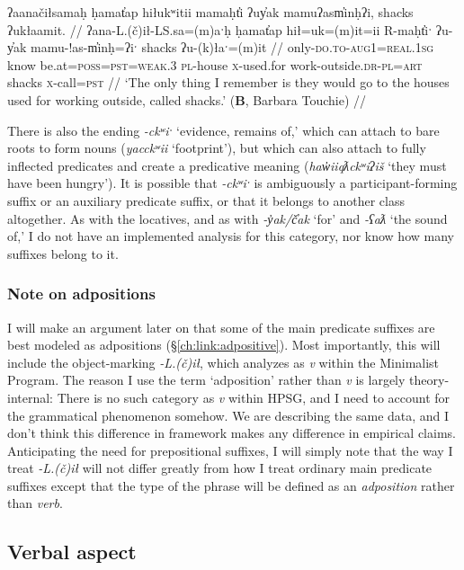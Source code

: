\ex \label{ex:uyak}
\begingl
\glpreamble ʔaanačiłsamaḥ ḥamat̓ap hiłukʷitii mamaḥt̓i ʔuy̓ak mamuʔasm̓inḥʔi, shacks ʔukłaamit. //
\gla ʔana-L.(č)ił-LS.sa=(m)aˑḥ ḥamat̓ap hił=uk=(m)it=ii R-maḥt̓iˑ ʔu-y̓ak mamu-!as-m̓inḥ=ʔiˑ shacks ʔu-(k)łaˑ=(m)it //
\glb only-\textsc{do.to}-\textsc{aug1}=\textsc{real.1sg} know be.at=\textsc{poss}=\textsc{pst}=\textsc{weak.3} \textsc{pl}-house \textsc{x}-used.for work-outside.\textsc{dr}-\textsc{pl}=\textsc{art} shacks \textsc{x}-call=\textsc{pst} //
\glft `The only thing I remember is they would go to the houses used for working outside, called shacks.' (\textbf{B}, Barbara Touchie) //
\endgl
\xe

There is also the ending \textit{-ckʷiˑ} `evidence, remains of,' which can attach to bare roots to form nouns (\textit{yacckʷii} `footprint'), but which can also attach to fully inflected predicates and create a predicative meaning (\textit{haw̓iiqƛckʷiʔiš} `they must have been hungry'). It is possible that \textit{-ckʷiˑ} is ambiguously a participant-forming suffix or an auxiliary predicate suffix, or that it belongs to another class altogether. As with the locatives, and as with \textit{-y̓ak/č̓ak} `for' and \textit{-ʕaƛ} `the sound of,' I do not have an implemented analysis for this category, nor know how many suffixes belong to it.

\subsubsection{Note on adpositions} \label{ch:clause:2pv:adp}

I will make an argument later on that some of the main predicate suffixes are best modeled as adpositions (\S\ref{ch:link:adpositive}). Most importantly, this will include the object-marking \textit{-L.(č)ił}, which \cite{woo2007b} analyzes as \textit{v} within the Minimalist Program. The reason I use the term `adposition' rather than \textit{v} is largely theory-internal: There is no such category as \textit{v} within HPSG, and I need to account for the grammatical phenomenon somehow. We are describing the same data, and I don't think this difference in framework makes any difference in empirical claims. Anticipating the need for prepositional suffixes, I will simply note that the way I treat \textit{-L.(č)ił} will not differ greatly from how I treat ordinary main predicate suffixes except that the type of the phrase will be defined as an \textit{adposition} rather than \textit{verb}.

\subsection{Verbal aspect} \label{ch:clause:aspect}

